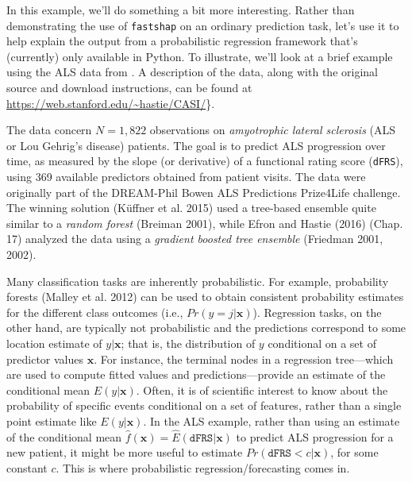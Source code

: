 In this example, we'll do something a bit more interesting. Rather than demonstrating the use of \texttt{fastshap} on an ordinary prediction task, let's use it to help explain the output from a probabilistic regression framework that's (currently) only available in Python. To illustrate, we'll look at a brief example using the ALS data from \citet[p.~349]{efron-2016-computer}. A description of the data, along with the original source and download instructions, can be found at \url{https://web.stanford.edu/~hastie/CASI/}\}.

The data concern \(N = 1,822\) observations on \emph{amyotrophic lateral sclerosis} (ALS or Lou Gehrig's disease) patients. The goal is to predict ALS progression over time, as measured by the slope (or derivative) of a functional rating score (\texttt{dFRS}), using 369 available predictors obtained from patient visits. The data were originally part of the DREAM-Phil Bowen ALS Predictions Prize4Life challenge. The winning solution (Küffner et al. 2015) used a tree-based ensemble quite similar to a \emph{random forest} (Breiman 2001), while Efron and Hastie (2016) (Chap. 17) analyzed the data using a \emph{gradient boosted tree ensemble} (Friedman 2001, 2002).

Many classification tasks are inherently probabilistic. For example, probability forests (Malley et al. 2012) can be used to obtain consistent probability estimates for the different class outcomes (i.e., \(Pr\left(y = j|\boldsymbol{x}\right)\)). Regression tasks, on the other hand, are typically not probabilistic and the predictions correspond to some location estimate of \(y|\boldsymbol{x}\); that is, the distribution of \(y\) conditional on a set of predictor values \(\boldsymbol{x}\). For instance, the terminal nodes in a regression tree---which are used to compute fitted values and predictions---provide an estimate of the conditional mean \(E\left(y|\boldsymbol{x}\right)\). Often, it is of scientific interest to know about the probability of specific events conditional on a set of features, rather than a single point estimate like \(E\left(y|\boldsymbol{x}\right)\). In the ALS example, rather than using an estimate of the conditional mean \(\hat{f}\left(\boldsymbol{x}\right) = \hat{E}\left(\texttt{dFRS}|\boldsymbol{x}\right)\) to predict ALS progression for a new patient, it might be more useful to estimate \(Pr\left(\texttt{dFRS} < c | \boldsymbol{x}\right)\), for some constant \(c\). This is where probabilistic regression/forecasting comes in.

